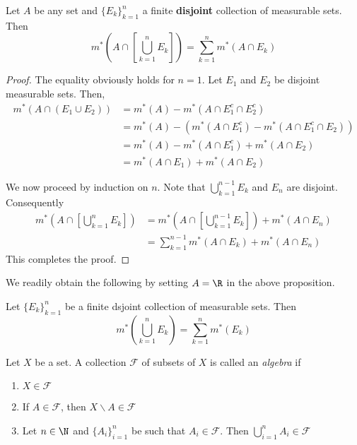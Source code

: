 \begin{proposition}
    Let $A$ be any set and $\{E_k\}_{k = 1}^n$ a finite \textbf{disjoint} collection of measurable sets. Then 
    \begin{equation*}
        m^*\left(A\cap\left[\bigcup_{k = 1}^n E_k\right]\right) = \sum_{k = 1}^n m^*(A\cap E_k)
    \end{equation*}
\end{proposition}
\begin{proof}
    The equality obviously holds for $n = 1$. Let $E_1$ and $E_2$ be disjoint measurable sets. Then, 
    \begin{align*}
        m^*(A\cap(E_1\cup E_2)) &= m^*(A) - m^*(A\cap E_1^c\cap E_2^c)\\
        &= m^*(A) - \left(m^*(A\cap E_1^c) - m^*(A\cap E_1^c\cap E_2)\right)\\
        &= m^*(A) - m^*(A\cap E_1^c) + m^*(A\cap E_2)\\
        &= m^*(A\cap E_1) + m^*(A\cap E_2)
    \end{align*}
    
    We now proceed by induction on $n$. Note that $\bigcup\limits_{k = 1}^{n - 1} E_k$ and $E_n$ are disjoint. Consequently 
    \begin{align*}
        m^*\left(A\cap\left[\bigcup_{k = 1}^n E_k\right]\right) &= m^*\left(A\cap\left[\bigcup_{k = 1}^{n - 1}E_k\right]\right) + m^*(A\cap E_n)\\
        &= \sum_{k = 1}^{n - 1} m^*(A\cap E_k) + m^*(A\cap E_n)
    \end{align*}
    This completes the proof.
\end{proof}

We readily obtain the following by setting $A = \R$ in the above proposition.

\begin{corollary}
    Let $\{E_k\}_{k = 1}^n$ be a finite dsjoint collection of measurable sets. Then 
    \begin{equation*}
        m^*\left(\bigcup_{k = 1}^n E_k\right) = \sum_{k = 1}^n m^*(E_k)
    \end{equation*}
\end{corollary}

\begin{definition}[Algebra]
    Let $X$ be a set. A collection $\mathcal F$ of subsets of $X$ is called an \textit{algebra} if 
    \begin{enumerate}[label=(\alph*)]
        \item $X\in\mathcal F$ 
        \item If $A\in\mathcal F$, then $X\backslash A\in\mathcal F$ 
        \item Let $n\in\N$ and $\{A_i\}_{i = 1}^n$ be such that $A_i\in\mathcal F$. Then $\bigcup\limits_{i = 1}^n A_i\in\mathcal F$
    \end{enumerate}
\end{definition}

